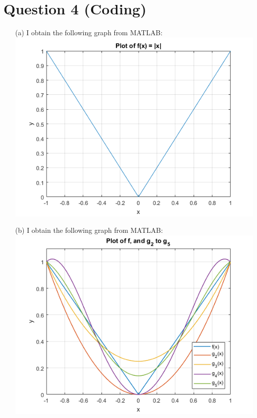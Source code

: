 \documentclass[11pt]{article}
\begin{document}
\section*{Question 4 (Coding)}
\begin{itemize}
	\item [(a)]
	I obtain the following graph from MATLAB:\\
	\includegraphics{abs_x_plot.png}
	
	\item [(b)]
	I obtain the following graph from MATLAB:\\
	\includegraphics{g_2_to_g_5.png}\pagebreak
	

\end{itemize}
\end{document}
